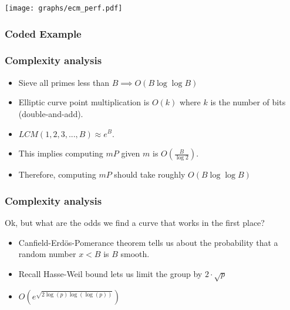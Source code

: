 \documentclass{beamer}
\begin{document}
\begin{frame}

\texttt{[image: graphs/ecm\_perf.pdf]}

\end{frame}

\begin{frame}
\frametitle{Coded Example}



\end{frame}

\begin{frame}
\frametitle{Complexity analysis}

\pause

\begin{itemize}[<+->]
	\item Sieve all primes less than $B \implies O(B \log \log B)$ \\
	\item Elliptic curve point multiplication is $O(k)$ where $k$ is the number of
		bits (double-and-add). \\
	\item $LCM(1,2,3,...,B) \approx e^B$.
	\item This implies computing $mP$ given $m$ is $O\left(\frac{B}{\log 2}\right)$.
	\item Therefore, computing $mP$ should take roughly $O(B \log \log B)$ \\
\end{itemize}

\end{frame}

\begin{frame}
\frametitle{Complexity analysis}

Ok, but what are the odds we find a curve that works in the first place?

\pause

\begin{itemize}[<+->]
	\item Canfield-Erdös-Pomerance theorem tells us about the probability that a
		random number $x < B$ is $B$ smooth. \\
	\item Recall Hasse-Weil bound lets us limit the group by $2 \cdot \sqrt{p}$  \\
	\item $O\left(e^{\sqrt{2\log(p) \log\left(\log(p)\right)}}\right)$
\end{itemize}

\end{frame}
\end{document}
